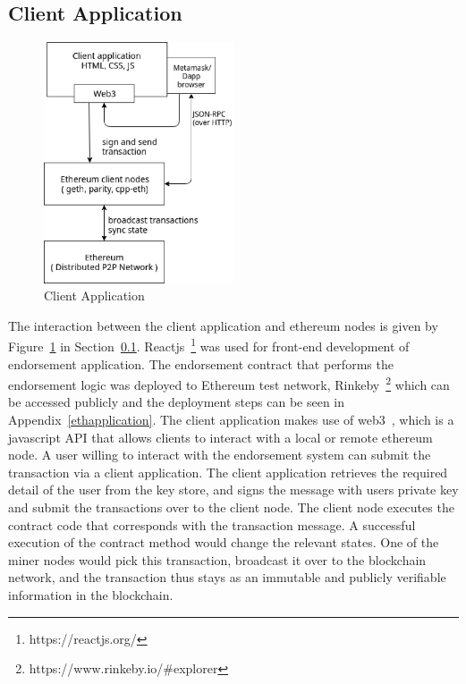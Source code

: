 \subsection{Client Application} \label{clientapp}
\begin{figure}
	\centering
	\includegraphics[width=0.5\textwidth]{Images/ClientApplication.eps}
	\caption{Client Application}
	\label{fig:ClientApp}
\end{figure}
The interaction between the client application and ethereum nodes is given by
Figure~\ref{fig:ClientApp} in Section~\ref{clientapp}.
Reactjs~\footnote{https://reactjs.org/} was used for front-end development of
endorsement application. The endorsement contract that performs the endorsement
logic was deployed to Ethereum test network,
Rinkeby~\footnote{https://www.rinkeby.io/#explorer} which can be accessed
publicly and the deployment steps can be seen in Appendix~\ref{ethapplication}.
The client application makes use of web3~\cite{web3}, which is a javascript API
that allows clients to interact with a local or remote ethereum node. A user
willing to interact with the endorsement system can submit the transaction via
a client application. The client application retrieves the required detail of
the user from the key store, and signs the message with users private key and
submit the transactions over to the client node. The client node executes the
contract code that corresponds with the transaction message. A successful
execution of the contract method would change the relevant states. One of the
miner nodes would pick this transaction, broadcast it over to the blockchain
network, and the transaction thus stays as an immutable and publicly verifiable
information in the blockchain. 
